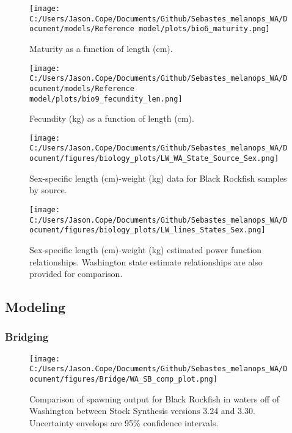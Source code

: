 \documentclass[11pt,
  english,
  letterpaper,
]{article}
\begin{document}
\pagebreak

\begin{figure}
\centering
\texttt{[image: C:/Users/Jason.Cope/Documents/Github/Sebastes\_melanops\_WA/Document/models/Reference model/plots/bio6\_maturity.png]}
\caption{Maturity as a function of length (cm).\label{fig:maturity}}
\end{figure}

\pagebreak

\begin{figure}
\centering
\texttt{[image: C:/Users/Jason.Cope/Documents/Github/Sebastes\_melanops\_WA/Document/models/Reference model/plots/bio9\_fecundity\_len.png]}
\caption{Fecundity (kg) as a function of length (cm).\label{fig:fecundity}}
\end{figure}

\pagebreak

\begin{figure}
\centering
\texttt{[image: C:/Users/Jason.Cope/Documents/Github/Sebastes\_melanops\_WA/Document/figures/biology\_plots/LW\_WA\_State\_Source\_Sex.png]}
\caption{Sex-specific length (cm)-weight (kg) data for Black Rockfish samples by source.\label{fig:len-weight-data}}
\end{figure}

\pagebreak

\begin{figure}
\centering
\texttt{[image: C:/Users/Jason.Cope/Documents/Github/Sebastes\_melanops\_WA/Document/figures/biology\_plots/LW\_lines\_States\_Sex.png]}
\caption{Sex-specific length (cm)-weight (kg) estimated power function relationships. Washington state estimate relationships are also provided for comparison.\label{fig:len-weight-or-wa}}
\end{figure}

\clearpage

\hypertarget{modeling}{%
\subsection{Modeling}\label{modeling}}

\hypertarget{bridging}{%
\subsubsection{Bridging}\label{bridging}}

\begin{figure}
\centering
\texttt{[image: C:/Users/Jason.Cope/Documents/Github/Sebastes\_melanops\_WA/Document/figures/Bridge/WA\_SB\_comp\_plot.png]}
\caption{Comparison of spawning output for Black Rockfish in waters off of Washington between Stock Synthesis versions 3.24 and 3.30. Uncertainty envelops are 95\% confidence intervals.\label{fig:ssb_bridge_comps}}
\end{figure}
\end{document}
